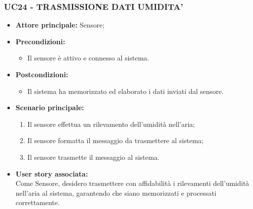 \subsubsection{UC24 - TRASMISSIONE DATI UMIDITA'}
\begin{itemize}
    \item \textbf{Attore principale:} Sensore;
    \item \textbf{Precondizioni:}
        \begin{itemize}
            \item Il sensore è attivo e connesso al sistema. 
        \end{itemize}
    \item \textbf{Postcondizioni:}
        \begin{itemize}
            \item Il sistema ha memorizzato ed elaborato i dati inviati dal sensore.
        \end{itemize}
    \item \textbf{Scenario principale:}
        \begin{enumerate}
            \item Il sensore effettua un rilevamento dell'umidità nell'aria;
            \item Il sensore formatta il messaggio da trasmettere al sistema;
            \item Il sensore trasmette il messaggio al sistema.
        \end{enumerate}
    \item \textbf{User story associata:} \\
    Come Sensore, desidero trasmettere con affidabilità i rilevamenti dell'umidità nell'aria al sistema, garantendo che siano memorizzati e processati correttamente.
\end{itemize}
